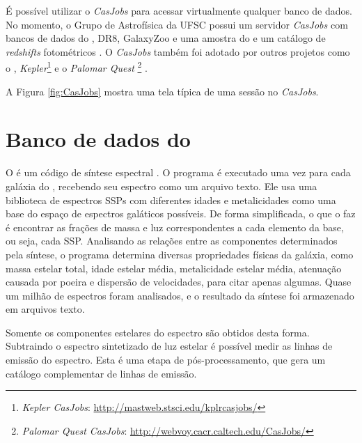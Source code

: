 É possível utilizar o {\em CasJobs} para acessar virtualmente qualquer banco de
dados. No momento, o Grupo de Astrofísica da UFSC possui um servidor {\em
CasJobs} com bancos de dados do \starlight, \SDSS DR8, GalaxyZoo
\citep{Lintott2008} e uma amostra do \galex e um catálogo de {\em redshifts}
fotométricos \citep{OMill2011}. O {\em CasJobs} também foi adotado por outros
projetos como o \galex, {\em Kepler}\footnote{{\em Kepler CasJobs}:
\url{http://mastweb.stsci.edu/kplrcasjobs/}} e o {\em Palomar Quest
}\footnote{{\em Palomar Quest CasJobs}:
\url{http://webvoy.cacr.caltech.edu/CasJobs/}} \citep{Djorgovski2008}.

A Figura \ref{fig:CasJobs} mostra uma tela típica de uma sessão no {\em
CasJobs}.



\section{Banco de dados do \STARLIGHT}

O \starlight é um código de síntese espectral \citep{CidFernandes2005}. O
programa é executado uma vez para cada galáxia do \SDSS, recebendo seu espectro
como um arquivo texto. Ele usa uma biblioteca de espectros SSPs com diferentes
idades e metalicidades como uma base do espaço de espectros galáticos possíveis.
De forma simplificada, o que o \starlight faz é encontrar as frações de massa e
luz correspondentes a cada elemento da base, ou seja, cada SSP. Analisando as
relações entre as componentes determinados pela síntese, o programa determina
diversas propriedades físicas da galáxia, como massa estelar total, idade
estelar média, metalicidade estelar média, atenuação causada por poeira e
dispersão de velocidades, para citar apenas algumas. Quase um milhão de
espectros foram analisados, e o resultado da síntese foi armazenado em arquivos
texto.

Somente os componentes estelares do espectro são obtidos desta forma. Subtraindo
o espectro sintetizado de luz estelar é possível medir as linhas de emissão do
espectro. Esta é uma etapa de pós-processamento, que gera um catálogo
complementar de linhas de emissão.

